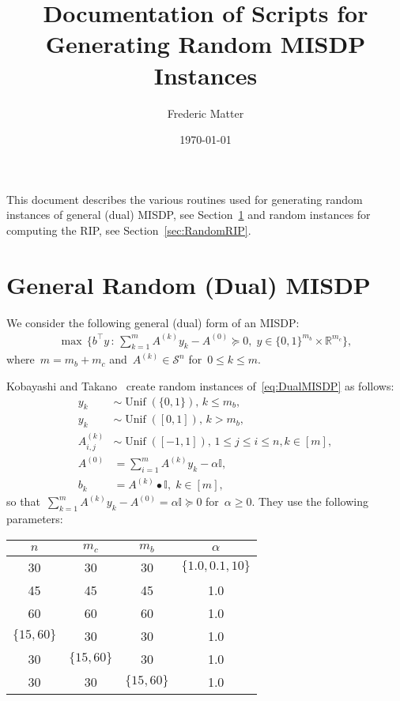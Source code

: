 \documentclass[11pt,a4paper]{article}
\title{Documentation of Scripts for Generating Random MISDP Instances}
\author{Frederic Matter}
\date{\today}
\newcommand{\R}{\mathds{R}}
\newcommand{\sym}{\mathcal{S}}
\newcommand{\suchthat}{\, : \,}
\newcommand{\T}{^\top}
\newcommand{\id}{\mathds{I}} %
\DeclareMathOperator{\unif}{Unif}
\theoremstyle{definition}
\begin{document}
\maketitle

This document describes the various routines used for generating random
instances of general (dual) MISDP, see Section~\ref{sec:RandomMISDP} and
random instances for computing the RIP, see Section~\ref{sec:RandomRIP}.

\section{General Random (Dual) MISDP}
\label{sec:RandomMISDP}
We consider the following general (dual) form of an MISDP:
\begin{align}\label{eq:DualMISDP}
  \max\, \{b\T y \suchthat \sum_{k=1}^m A^{(k)}y_k - A^{(0)} \succeq 0,\; y
  \in \{0,1\}^{m_b} \times \R^{m_c}\},
\end{align}
where~$m = m_b + m_c$ and~$A^{(k)} \in \sym^n$ for~$0\leq k\leq m$.

Kobayashi and Takano~\cite{Kob20} create random instances
of~\eqref{eq:DualMISDP} as follows:
\begin{align*}
  y_k &\sim \unif(\{0,1\}), \, k \leq m_b,\\
  y_k &\sim \unif([0,1]),\, k > m_b, \\
  A^{(k)}_{i,j} &\sim \unif([-1,1]),\, 1\leq j \leq i \leq n, k \in [m],\\
  A^{(0)} &= \sum_{i=1}^m A^{(k)}y_k - \alpha \id,\\
  b_k &= A^{(k)}\bullet \id, \; k \in [m],
\end{align*}
so that~$\sum_{k=1}^m A^{(k)}y_k - A^{(0)} = \alpha\id \succeq 0$
for~$\alpha \geq 0$. They use the following parameters:
\begin{table}[h]
  \centering
  \begin{tabular}{cccc}
    $n$ & $m_c$ & $m_b$ & $\alpha$ \\
    \toprule
    30 & 30 & 30 & $\{1.0,0.1,10\}$ \\
    45 & 45 & 45 & 1.0 \\
    60 & 60 & 60 & 1.0 \\
    $\{15,60\}$ & 30 & 30 & 1.0 \\
    30 & $\{15,60\}$ & 30 & 1.0 \\
    30 & 30 & $\{15,60\}$ & 1.0
  \end{tabular}
\end{table}
\end{document}
